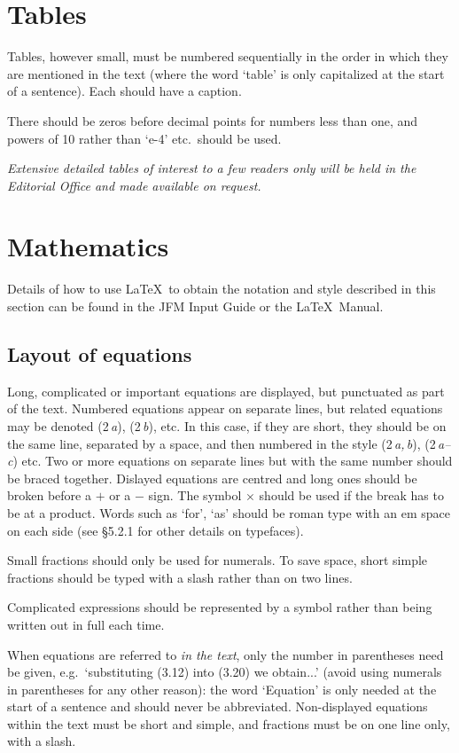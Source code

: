 \section{Tables}
Tables, however small, must be numbered sequentially in the order in which
they are mentioned in the text (where the word `table' is only capitalized at
the start of a sentence). Each should have a caption.

There should be zeros before decimal points for numbers less than one, and
powers of 10 rather than `e-4' etc.\ should be used.

{\em Extensive detailed tables of interest to a few readers only
will be held in the Editorial Office and made available on request.}

\section{Mathematics}

Details of how to use \LaTeX\ to obtain the notation and style described in
this section can be found in the JFM Input Guide or the \LaTeX\ Manual.

\subsection{Layout of equations}
Long, complicated or important equations are displayed, but
punctuated as part of the text. Numbered equations appear on separate lines,
but related equations may be denoted (2\,{\it a\/}), (2\,{\it b\/}), etc. In
this case, if they are short, they should be on the same line, separated by a
space, and then numbered in the style (2\,{\it a,\,b\/}), (2\,{\it a--c\/})
etc. Two or more equations on separate lines but with the same number should
be braced together. Dislayed equations are centred and long ones should be
broken before a $+$ or a $-$ sign. The symbol $\times $ should be used if the
break has to be at a product. Words such as `for', `as' should be roman type
with an em space on each side (see \S 5.2.1 for other details on typefaces).

Small fractions should only be used for numerals. To save space, short simple
fractions should be typed with a slash rather than on two lines.

Complicated expressions should be represented by a symbol rather than being
written out in full each time.

\vspace{3 mm}

When equations are referred to {\em in the text}, only the number in
parentheses need be given, e.g.\ `substituting (3.12) into (3.20) we
obtain...' (avoid using numerals in parentheses for any other reason): the
word `Equation' is only needed at the start of a sentence and should never 
be abbreviated. Non-displayed equations within the text must be short and
simple, and fractions must be on one line only, with a slash.


